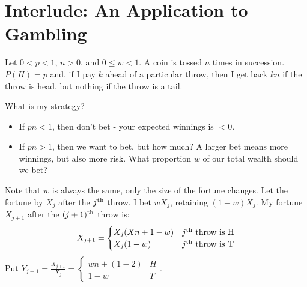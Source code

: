 \documentclass[10pt,a4paper]{article}
\begin{document}
\section{Interlude: An Application to Gambling}
Let $0 < p < 1$, $n>0$, and $0 \leq w <1$. A coin is tossed $n$ times in succession. $P(H) = p$ and, if I pay $k$ ahead of a particular throw, then I get back $kn$ if the throw is head, but nothing if the throw is a tail.

What is my strategy?
\begin{itemize}
\item If $pn <1$, then don't bet - your expected winnings is $<0$.
\item If $pn >1$, then we want to bet, but how much? A larger bet means more winnings, but also more risk. What proportion $w$ of our total wealth should we bet?
\end{itemize}

Note that $w$ is always the same, only the size of the fortune changes. Let the fortune by $X_j$ after the $j\textsuperscript{th}$ throw. I bet $wX_j$, retaining $(1-w)X_j$. My fortune $X_{j+1}$ after the $(j+1)\textsuperscript{th}$ throw is:
\begin{align*}
X_{j+1} = \begin{cases} X_j(Xn + 1-w) & j\textsuperscript{th} \text{ throw is H}\\X_j(1-w) & j\textsuperscript{th}\text{ throw is T}\end{cases}
\end{align*}
Put $Y_{j+1} = \frac{X_{j+1}}{X_j} = \begin{cases} wn + (1-2) & H \\ 1-w & T\end{cases}$.
\end{document}
